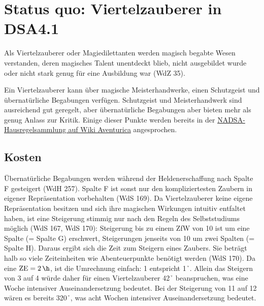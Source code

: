 \section{Status quo: Viertelzauberer in DSA4.1}
Als Viertelzauberer oder Magiedilettanten werden magisch begabte Wesen verstanden, deren magisches Talent unentdeckt blieb, nicht ausgebildet wurde oder nicht stark genug für eine Ausbildung war (WdZ 35).

Ein Viertelzauberer kann über magische Meisterhandwerke, einen Schutzgeist und übernatürliche Begabungen verfügen. Schutzgeist und Meisterhandwerk sind ausreichend gut geregelt, aber übernatürliche Begabungen aber bieten mehr als genug Anlass zur Kritik. Einige dieser Punkte werden bereits in der \href{http://www.wiki-aventurica.de/wiki/Hausregelsammlung/NADSA/Viertelzauberer}{NADSA-Hausregelsammlung auf Wiki Aventurica} angesprochen.

\subsection{Kosten}
Übernatürliche Begabungen werden während der Heldenerschaffung nach Spalte F gesteigert (WdH 257). Spalte F ist sonst nur den kompliziertesten Zaubern in eigener Repräsentation vorbehalten (WdS 169). Da Viertelzauberer keine eigene Repräsentation besitzen und sich ihre magischen Wirkungen intuitiv entfaltet haben, ist eine Steigerung stimmig nur nach den Regeln des Selbststudiums möglich (WdS 167, WdS 170): Steigerung bis zu einem ZfW von 10 ist um eine Spalte (= Spalte G) erschwert, Steigerungen jenseits von 10 um zwei Spalten (= Spalte H). Daraus ergibt sich die Zeit zum Steigern eines Zaubers. Sie beträgt halb so viele Zeiteinheiten wie Abenteuerpunkte benötigt werden (WdS 170). Da eine $\si{ZE} = \SI{2}{\h}$, ist die Umrechnung einfach: \SI{1}{\AP} entspricht \SI{1}{\h}. Allein das Steigern von 3 auf 4 würde daher für einen Viertelzauberer \SI{42}{\h} beanspruchen, was eine Woche intensiver Auseinandersetzung bedeutet. Bei der Steigerung von 11 auf 12 wären es bereits \SI{320}{\h}, was acht Wochen intensiver Auseinandersetzung bedeutet.

